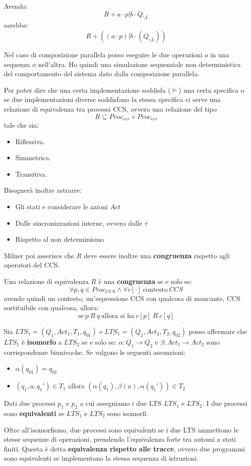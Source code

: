 \begin{esempio} 
    Avendo: $$R + a \cdot p | b \cdot Q_{\setminus L}$$ sarebbe: $$R + ((a \cdot p) | b \cdot (Q_{\setminus L}))$$  
\end{esempio}
Nel caso di composizione parallela posso eseguire le due operazioni o in una sequenza o nell'altra. Ho quindi una simulazione sequenziale non deterministica del comportamento del sistema dato dalla composizione parallela.

Per poter dire che una certa implementazione soddisfa ($\models$) una certa specifica o se due implementazioni diverse soddisfano la stessa specifica ci serve una relazione di equivalenza tra processi CCS, ovvero una relazione del tipo $$R \subseteq Proc_{ccs} \times Proc_{ccs}$$ tale che sia:
\begin{itemize}
    \item Riflessiva.
    \item Simmetrica.
    \item Transitiva.
\end{itemize}
Bisognerà inoltre astrarre:
\begin{itemize}
    \item Gli stati e considerare le azioni $Act$
    \item Dalle sincronizzazioni interne, ovvero dalle $\tau$
    \item Rispetto al non determinismo
\end{itemize}
Milner poi asserisce che $R$ deve essere inoltre una \textbf{congruenza} rispetto agli operatori del CCS.
\begin{definizione}
    Una relazione di equivalenza $R$ è una \textbf{congruenza} se e solo se: $$\forall p, q \in Proc_{CCS} \land \forall c[\cdot] \ \text{contesto} \ CCS $$ avendo quindi un contesto, un’espressione CCS con qualcosa di mancante, CCS sostituibile con qualcosa, allora: $$ \text{se} \ p\ R\ q \ \text{allora si ha} \ c[p] \ R \ c[q]$$
\end{definizione}
Sia $LTS_1 = (Q_1, Act_1, T_1, q_{01})$ e $LTS_1 = (Q_2, Act_2, T_2, q_{02})$ posso affermare che $LTS_1$ è \textbf{isomorfo} a $LTS_2$ se e solo se: $\alpha: Q_1 \to Q_2$ e $\beta: Act_1 \to Act_2$ sono corrispondenze biunivoche. Se valgono le seguenti assunzioni:
\begin{itemize}
    \item $\alpha(q_{01}) = q_{02}$
    \item $(q_1, a, q_1') \in T_1$ allora $(\alpha(q_1), \beta(a), \alpha(q_1')) \in T_2$
\end{itemize}
\begin{teorema}
    Dati due processi $p_1$ e $p_2$ a cui assegniamo i due LTS $LTS_1$ e $LTS_2$. I due processi sono \textbf{equivalenti} se $LTS_1$ e $LTS_2$ sono isomorfi. 
\end{teorema}
Oltre all'isomorfismo, due processi sono equivalenti se i due LTS ammettono le stesse sequenze di operazioni, prendendo l'equivalenza forte tra automi a stati finiti. Questa è detta \textbf{equivalenza rispetto alle tracce}, ovvero due programmi sono equivalenti se implementano la stessa sequenza di istruzioni.
    
